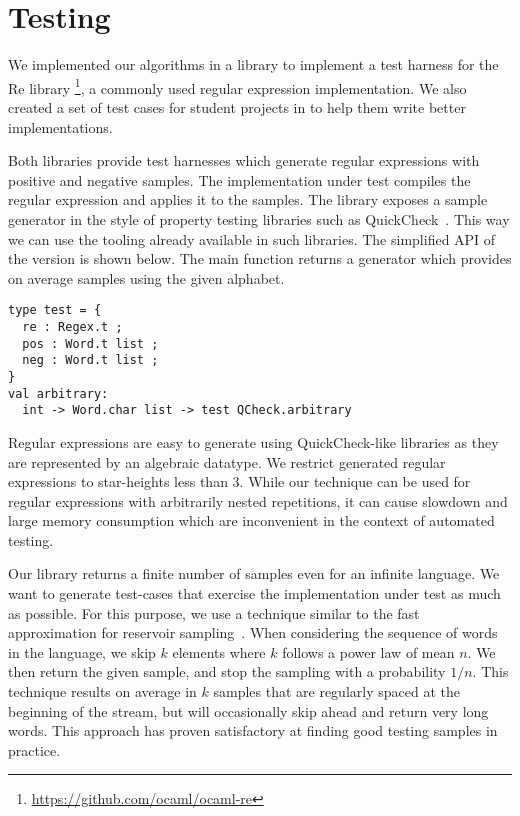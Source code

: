 \section{Testing}
\label{sec:test}

We implemented our algorithms in a library to implement a test harness for the \ocaml Re library%
\footnote{\url{https://github.com/ocaml/ocaml-re}},
a commonly used \ocaml regular expression implementation.
%
We also created a set of test cases for student projects in \haskell
to help them write better implementations.

Both libraries provide test harnesses which generate
regular expressions with positive and negative samples. The
implementation under test compiles the regular expression and applies it to the samples. 
The library exposes a sample generator in the style of
property testing libraries such as QuickCheck~\cite{DBLP:conf/icfp/ClaessenH00}.
This way we can use the tooling already available in such libraries.
%
The simplified API of the \ocaml version is shown below.
The main function  returns a generator
which provides on average  samples using the given alphabet.
%
\begin{lstlisting}
type test = {
  re : Regex.t ;
  pos : Word.t list ;
  neg : Word.t list ;
}
val arbitrary:
  int -> Word.char list -> test QCheck.arbitrary
\end{lstlisting}

Regular expressions are easy to generate using QuickCheck-like
libraries as they are represented by an algebraic datatype.  We
restrict generated regular expressions to star-heights less than
3. While our technique can be used for regular expressions with
arbitrarily nested repetitions, it can cause slowdown and large memory
consumption which are inconvenient in the context of automated
testing.

Our library returns a finite number of samples even for an infinite language. We want to generate 
test-cases that exercise the implementation under test as much as
possible. For this purpose, we use a technique similar to the fast
approximation for reservoir
sampling~\citep{DBLP:journals/toms/Vitter87}.  When considering the
sequence of words in the language, we skip $k$ elements where $k$
follows a power law of mean $n$. We then return the given sample, and
stop the sampling with a probability $1/n$.
%
This technique results on average in $k$ samples that are regularly
spaced at the beginning of the stream, but will occasionally skip ahead
and return very long words. This approach has proven satisfactory at finding good
testing samples in practice.


